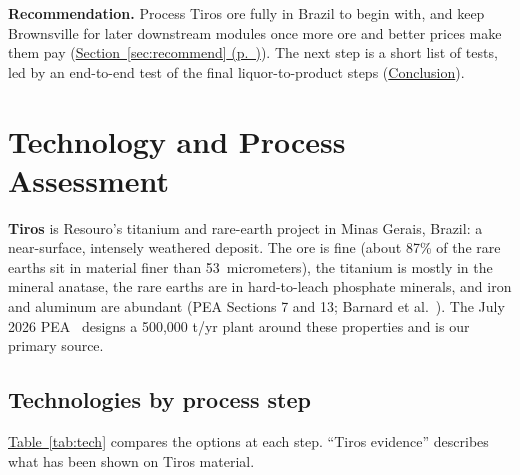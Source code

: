 \documentclass[11pt,letterpaper]{article}
\newcommand{\sref}[1]{\hyperref[#1]{Section~\ref*{#1} (p.~\pageref*{#1})}}
\newcommand{\tref}[1]{\hyperref[#1]{Table~\ref*{#1}}}
\begin{document}
\textbf{Recommendation.} Process Tiros ore fully in Brazil to begin with, and keep Brownsville for later downstream modules once more ore and better prices make them pay (\sref{sec:recommend}). The next step is a short list of tests, led by an end-to-end test of the final liquor-to-product steps (\hyperref[sec:conclusion]{Conclusion}).

\section{Technology and Process Assessment}\label{sec:tech}

\textbf{Tiros} is Resouro's titanium and rare-earth project in Minas Gerais, Brazil: a near-surface, intensely weathered deposit. The ore is fine (about 87\% of the rare earths sit in material finer than 53~micrometers), the titanium is mostly in the mineral anatase, the rare earths are in hard-to-leach phosphate minerals, and iron and aluminum are abundant (PEA Sections 7 and 13; Barnard et al.~\cite{barnard}). The July 2026 PEA~\cite{pea} designs a 500,000 t/yr plant around these properties and is our primary source.

\subsection{Technologies by process step}\label{sec:steps}
\tref{tab:tech} compares the options at each step. ``Tiros evidence'' describes what has been shown on Tiros material.
\end{document}
